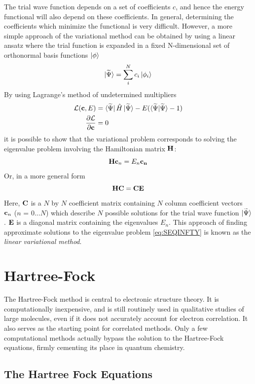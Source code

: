 The trial wave function depends on a set of coefficients $c$, and hence the energy functional will also depend on these coefficients. In general, determining the coefficients which minimize the functional is very difficult. However, a more simple approach of the variational method can be obtained by using a linear ansatz where the trial function is expanded in a fixed N-dimensional set of orthonormal basis functions $\ket{\phi}$
\begin{equation}
\ket{\smash{\widetilde{\Psi}}} = \sum^N_i c_i \ket{\phi_i}
\end{equation}
By using Lagrange's method of undetermined multipliers
\begin{align}
\mathcal{L}(\mathbf{c},E) &= \bra{\smash{\widetilde{\Psi}}}\hat{H}\ket{\smash{\widetilde{\Psi}}} - E(\bra{\smash{\widetilde{\Psi}}}\ket{\smash{\widetilde{\Psi}}} - 1) \\
\frac{\partial \mathcal{L}}{\partial \mathcal{\mathbf{c}}} &= 0
\end{align}
\noindent it is possible to show that the variational problem corresponds to solving the eigenvalue problem involving the Hamiltonian matrix $\mathbf{H}$:
\begin{equation}
\mathbf{H}\mathbf{c}_n = E_n \mathbf{c_n}
\end{equation}
\noindent Or, in a more general form
\begin{equation}
\mathbf{H}\mathbf{C} = \mathbf{C}\mathbf{E}
\end{equation}
\noindent Here, $\mathbf{C}$ is a $N$ by $N$ coefficient matrix containing $N$ column coefficient vectors $\mathbf{c}_n$ ($n$ = $0...N$) which describe $N$ possible solutions for the trial wave function $\ket{\smash{\widetilde{\Psi}}}$. $\mathbf{E}$ is a diagonal matrix containing the eigenvalues $E_n$. This approach of finding approximate solutions to the eigenvalue problem \ref{eq:SEQINFTY} is known as the \emph{linear variational method}. 

\section{Hartree-Fock}

The Hartree-Fock method is central to electronic structure theory. It is computationally inexpensive, and is still routinely used in qualitative studies of large molecules, even if it does not accurately account for electron correlation. It also serves as the starting point for correlated methods. Only a few computational methods actually bypass the solution to the Hartree-Fock equations, firmly cementing its place in quantum chemistry.

\subsection{The Hartree Fock Equations}

